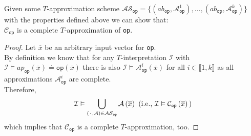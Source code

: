 \begin{lemma}
    \label{lemma:refinement_approach:abstraction_scheme:as_completeness}
Given some $T$-approximation scheme 
$\mathcal{AS}_{\texttt{op}} = \{ \left(ab_{\texttt{op}}, \mathcal{A}^1_{\texttt{op}}\right),\dots,\left(ab_{\texttt{op}}, \mathcal{A}^k_{\texttt{op}}\right) \}$
with the properties defined above we can show that:\\
$\mathcal{C}_{\texttt{op}}$ is a complete $T$-approximation of \texttt{op}.
\begin{proof}
Let $\overline{x}$ be an arbitrary input vector for \texttt{op}.\\
By definition we know that for any $T$-interpretation $\mathcal{I}$ with $\mathcal{I} \vDash ap_{\texttt{op}}\left(\overline{x}\right) \doteq \texttt{op}\left(\overline{x}\right)$ there is also $\mathcal{I} \vDash \mathcal{A}^i_{\texttt{op}}\left(\overline{x}\right)$ for all $i\in\llbracket1,k\rrbracket$ as all approximations $\mathcal{A}^i_{\texttt{op}}$ are complete.\\
Therefore,
\[
    \mathcal{I} \vDash \bigcup\limits_{\left({\mkern 2mu\cdot\mkern 2mu},\mathcal{A}\right)\in\mathcal{AS}_{\texttt{op}}} \mathcal{A}\left(\overline{x}\right)
    \text{ (i.e., }\mathcal{I} \vDash \mathcal{C}_{\texttt{op}}\left(\overline{x}\right)\text{)}
\]
which implies that $\mathcal{C}_{\texttt{op}}$ is a complete $T$-approximation, too.
\end{proof}
\end{lemma}

